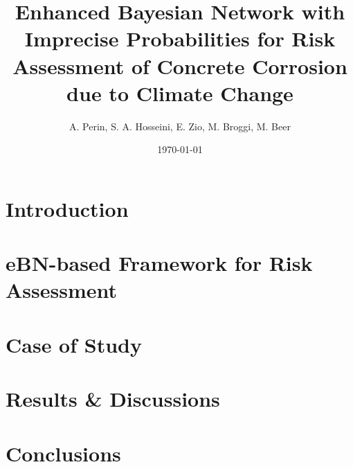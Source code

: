 \documentclass{article}
\title{Enhanced Bayesian Network with Imprecise Probabilities for Risk Assessment of Concrete Corrosion due to Climate Change}
\author{A. Perin, S. A. Hosseini, E. Zio, M. Broggi, M. Beer}
\date{\today}
\begin{document}
\maketitle


\begin{abstract}\label{abstract}
    
\end{abstract}

\section{Introduction}\label{introduction}
    

\section{eBN-based Framework for Risk Assessment}\label{ebn}
    
    
\section{Case of Study}\label{caseofstudy}
    

\section{Results \& Discussions}\label{results}
    
\section{Conclusions}\label{conclusions}

\newpage

\printbibliography{}
\end{document}
